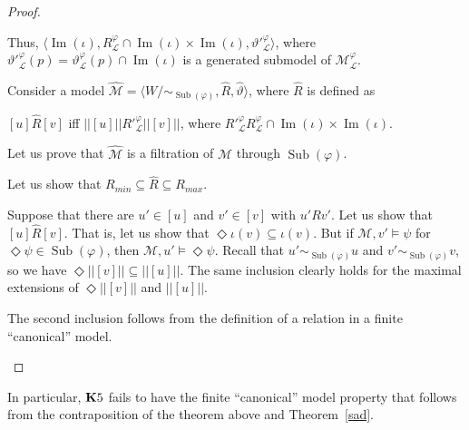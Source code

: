 \documentclass[a4paper]{article}
\theoremstyle{defin}
\theoremstyle{theorem}
\theoremstyle{prop}
\theoremstyle{lemma}
\theoremstyle{fact}
\theoremstyle{ex}
\theoremstyle{col}
\begin{document}
\begin{proof}
\begin{enumerate}
    Thus, $\langle \operatorname{Im}(\iota), R_{\mathcal{L}}^{\varphi} \cap \operatorname{Im}(\iota) \times \operatorname{Im}(\iota), {\vartheta'}_{\mathcal{L}}^{\varphi} \rangle$, where ${\vartheta'}_{\mathcal{L}}^{\varphi}(p) = \vartheta_{\mathcal{L}}^{\varphi}(p) \cap \operatorname{Im}(\iota)$ is a generated submodel of $\mathcal{M}_{\mathcal{L}}^{\varphi}$.

    Consider a model $\widehat{\mathcal{M}} = \langle W/\sim_{\operatorname{Sub}(\varphi)}, \widehat{R}, \widehat{\vartheta} \rangle$, where $\widehat{R}$ is defined as
    \begin{center}
      $[u] \widehat{R} [v]$ iff $||[u]|| {R'}_{\mathcal{L}}^{\varphi} ||[v]||$, where ${R'}_{\mathcal{L}}^{\varphi} R_{\mathcal{L}}^{\varphi} \cap \operatorname{Im}(\iota) \times \operatorname{Im}(\iota)$.
    \end{center}
    Let us prove that $\widehat{\mathcal{M}}$ is a filtration of $\mathcal{M}$ through $\operatorname{Sub}(\varphi)$.

    Let us show that $R_{min} \subseteq \widehat{R} \subseteq R_{max}$.

    Suppose that there are $u' \in [u]$ and $v' \in [v]$ with $u' R v'$. Let us show that
    $[u] \widehat{R} [v]$. That is, let us show that $\Diamond \iota(v) \subseteq \iota(v)$.
    But if $\mathcal{M}, v' \models \psi$ for $\Diamond \psi \in \operatorname{Sub}(\varphi)$, then
    $\mathcal{M}, u' \models \Diamond \psi$. Recall that $u' \sim_{\operatorname{Sub}(\varphi)} u$ and $v' \sim_{\operatorname{Sub}(\varphi)} v$, so we have $\Diamond ||[v]|| \subseteq ||[u]||$.
    The same inclusion clearly holds for the maximal extensions of $\Diamond ||[v]||$ and $||[u]||$.

    The second inclusion follows from the definition of a relation in a finite ``canonical'' model.
  \end{enumerate}
\end{proof}

In particular, ${\bf K}5$ fails to have the finite ``canonical'' model property that
follows from the contraposition of the theorem above and Theorem~\ref{sad}.



\end{document}
